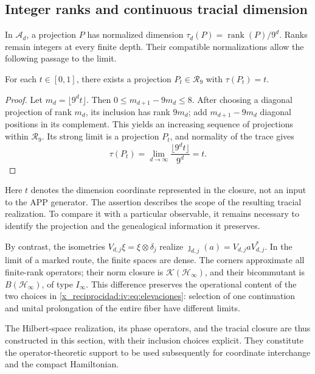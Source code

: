 \subsection{Integer ranks and continuous tracial dimension}

In \(\mathcal A_d\), a projection \(P\) has normalized
dimension \(\tau_d(P)=\operatorname{rank}(P)/9^d\).
Ranks remain integers at every finite depth. Their
compatible normalizations allow the following passage to the limit.

\begin{proposition}
\label{x_reciprocidad:iv:prop:dimension-tracial}
For each \(t\in[0,1]\), there exists a projection
\(P_t\in\mathcal R_9\) with \(\tau(P_t)=t\).
\end{proposition}
\begin{proof}
Let \(m_d=\lfloor9^dt\rfloor\). Then
\(0\leq m_{d+1}-9m_d\leq8\). After choosing a diagonal projection
of rank \(m_d\), its inclusion has rank \(9m_d\);
add \(m_{d+1}-9m_d\) diagonal positions in its complement.
This yields an increasing sequence of projections within
\(\mathcal R_9\). Its strong limit is a projection \(P_t\),
and normality of the trace gives
\[
 \tau(P_t)=\lim_{d\to\infty}\frac{\lfloor9^dt\rfloor}{9^d}=t.
\]
\end{proof}

Here \(t\) denotes the dimension coordinate represented
in the closure, not an input to the APP generator. The assertion
describes the scope of the resulting tracial realization. To
compare it with a particular observable, it remains necessary to
identify the projection and the genealogical information it preserves.

By contrast, the isometries
\(V_{d,j}\xi=\xi\otimes\delta_j\) realize
\(\jmath_{d,j}(a)=V_{d,j}aV_{d,j}^*\). In the limit of a
marked route, the finite spaces are dense. The corners
approximate all finite-rank operators; their norm closure
is \(\mathcal K(\mathcal H_\infty)\), and their bicommutant is
\(B(\mathcal H_\infty)\), of type \(I_\infty\). This
difference preserves the operational content of the two choices
in \eqref{x_reciprocidad:iv:eq:elevaciones}: selection of one continuation and
unital prolongation of the entire fiber have different limits.

The Hilbert-space realization, its phase operators, and the tracial
closure are thus constructed in this section, with their inclusion
choices explicit. They constitute the
operator-theoretic support to be used subsequently for coordinate
interchange and the compact Hamiltonian.
